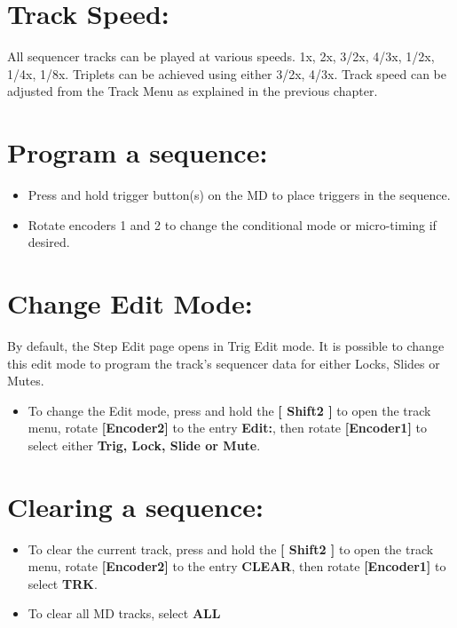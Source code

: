 \vspace{-0.3cm}

\section{Track Speed:}
All sequencer tracks can be played at various speeds. 1x, 2x, 3/2x, 4/3x, 1/2x, 1/4x, 1/8x. Triplets can be achieved using either 3/2x, 4/3x. 
Track speed can be adjusted from the Track Menu as explained in the previous chapter.

\section{Program a sequence:}
\begin{itemize}
\item Press and hold trigger button(s) on the MD to place triggers in the sequence.
\item Rotate encoders 1 and 2 to change the conditional mode or micro-timing if desired.
\end{itemize}

\section{Change Edit Mode:}
By default, the Step Edit page opens in Trig Edit mode. It is possible to change this edit mode to program the track's sequencer data for either Locks, Slides or Mutes.
\begin{itemize}
\item To change the Edit mode, press and hold the\textbf{ [ Shift2 ]} to open the track menu, rotate \textbf{[Encoder2]} to the entry \textbf{Edit:}, then rotate \textbf{[Encoder1]} to select either \textbf{Trig, Lock, Slide or Mute}.
\end{itemize}
\vspace{-0.3cm}

\section{Clearing a sequence:}
\begin{itemize}
\item To clear the current track, press and hold the\textbf{ [ Shift2 ]} to open the track menu, rotate \textbf{[Encoder2]} to the entry \textbf{CLEAR}, then rotate \textbf{[Encoder1]} to select \textbf{TRK}.
\item To clear all MD tracks, select \textbf{ALL}
\end{itemize}


